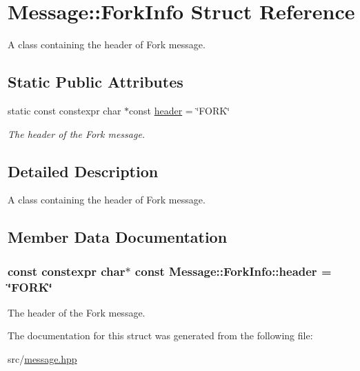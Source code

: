 \hypertarget{struct_message_1_1_fork_info}{\section{Message\-:\-:Fork\-Info Struct Reference}
\label{struct_message_1_1_fork_info}
}


A class containing the header of Fork message.  


\subsection*{Static Public Attributes}
\begin{DoxyCompactItemize}
\item 
static const constexpr char $\ast$const \hyperlink{struct_message_1_1_fork_info_a87dc098addddec52c8eacd4975d84c84}{header} = \char`\"{}F\-O\-R\-K\char`\"{}
\begin{DoxyCompactList}\small\item\em The header of the Fork message. \end{DoxyCompactList}\end{DoxyCompactItemize}


\subsection{Detailed Description}
A class containing the header of Fork message. 

\subsection{Member Data Documentation}
\hypertarget{struct_message_1_1_fork_info_a87dc098addddec52c8eacd4975d84c84}{
\subsubsection[{header}]{\setlength{\rightskip}{0pt plus 5cm}const constexpr char$\ast$ const Message\-::\-Fork\-Info\-::header = \char`\"{}F\-O\-R\-K\char`\"{}\hspace{0.3cm}{\ttfamily [static]}}}\label{struct_message_1_1_fork_info_a87dc098addddec52c8eacd4975d84c84}


The header of the Fork message. 



The documentation for this struct was generated from the following file\-:\begin{DoxyCompactItemize}
\item 
src/\hyperlink{message_8hpp}{message.\-hpp}\end{DoxyCompactItemize}
